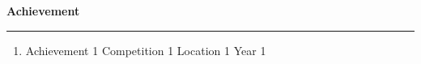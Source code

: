 

\textbf{Achievement}

\par\noindent\rule{\textwidth}{0.2pt}

\begin{enumerate}
    \item {{Achievement 1} %
            {Competition 1} %
            {Location 1} %
            {Year 1}} %
\end{enumerate}
